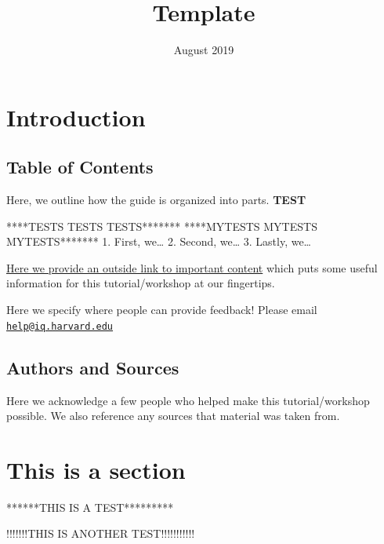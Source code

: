 \documentclass[]{book}
\title{Template}
\author{}
\date{August 2019}
\begin{document}
\maketitle

{
\setcounter{tocdepth}{1}
\tableofcontents
}
\hypertarget{introduction}{%
\chapter*{Introduction}\label{introduction}}

\hypertarget{table-of-contents}{%
\section*{Table of Contents}\label{table-of-contents}}

Here, we outline how the guide is organized into parts.
\textbf{TEST}

****TESTS TESTS TESTS*******
****MYTESTS MYTESTS MYTESTS*******
1. First, we\ldots{}
2. Second, we\ldots{}
3. Lastly, we\ldots{}

\href{https://www.rstudio.com/wp-content/uploads/2015/03/devtools-cheatsheet.pdf}{Here we provide an outside link to important content} which puts some useful information for this tutorial/workshop at our fingertips.

Here we specify where people can provide feedback! Please email \href{mailto:help@iq.harvard.edu}{\nolinkurl{help@iq.harvard.edu}}

\hypertarget{authors-and-sources}{%
\section*{Authors and Sources}\label{authors-and-sources}}

Here we acknowledge a few people who helped make this tutorial/workshop possible. We also reference any sources that material was taken from.

\hypertarget{this-is-a-section}{%
\chapter{This is a section}\label{this-is-a-section}}

******THIS IS A TEST*********

!!!!!!!THIS IS ANOTHER TEST!!!!!!!!!!!
\end{document}
